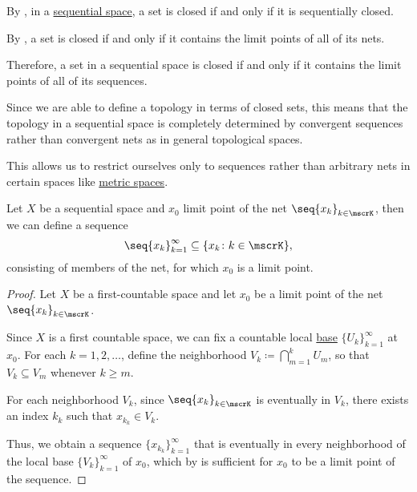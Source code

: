 \begin{remark}\label{rem:sequential_spaces}
  By , in a \hyperref[def:sequential_space]{sequential space}, a set is closed if and only if it is sequentially closed.

  By , a set is closed if and only if it contains the limit points of all of its nets.

  Therefore, a set in a sequential space is closed if and only if it contains the limit points of all of its sequences.

  Since we are able to define a topology in terms of closed sets, this means that the topology in a sequential space is completely determined by convergent sequences rather than convergent nets as in general topological spaces.

  This allows us to restrict ourselves only to sequences rather than arbitrary nets in certain spaces like \hyperref[def:metric_space]{metric spaces}.
\end{remark}

\begin{lemma}\label{thm:sequential_space_convergence}
  Let \( X \) be a sequential space and \( x_0 \) limit point of the net \( \seq{ x_k }_{k \in \mscrK} \), then we can define a sequence
  \begin{equation*}
    \seq{ x_k }_{k=1}^\infty \subseteq \{ x_k \colon k \in \mscrK \},
  \end{equation*}
  consisting of members of the net, for which \( x_0 \) is a limit point.
\end{lemma}
\begin{proof}
  Let \( X \) be a first-countable space and let \( x_0 \) be a limit point of the net \( \seq{ x_k }_{k \in \mscrK} \).

  Since \( X \) is a first countable space, we can fix a countable local \hyperref[def:topological_local_base]{base} \( \{ U_k \}_{k=1}^\infty \) at \( x_0 \). For each \( k = 1, 2, \ldots \), define the neighborhood \( V_k \coloneqq \bigcap_{m=1}^k U_m \), so that \( V_k \subseteq V_m \) whenever \( k \geq m \).

  For each neighborhood \( V_k \), since \( \seq{ x_k }_{k \in \mscrK} \) is eventually in \( V_k \), there exists an index \( k_k \) such that \( x_{k_k} \in V_k \).

  Thus, we obtain a sequence \( \{ x_{k_k} \}_{k=1}^\infty \) that is eventually in every neighborhood of the local base \( \{ V_k \}_{k=1}^\infty \) of \( x_0 \), which by  is sufficient for \( x_0 \) to be a limit point of the sequence.
\end{proof}

